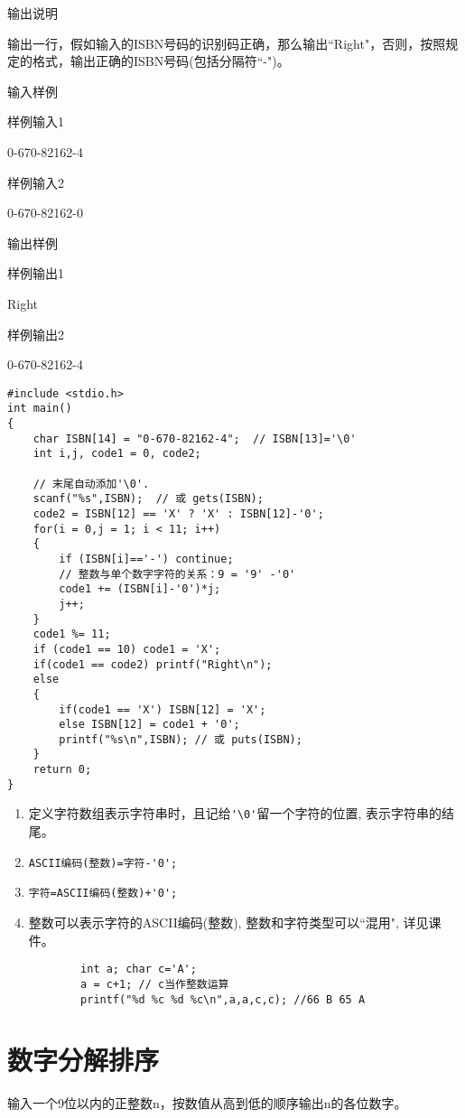 输出说明	

输出一行，假如输入的ISBN号码的识别码正确，那么输出``Right"，否则，按照规定的格式，输出正确的ISBN号码(包括分隔符``-")。

输入样例	

样例输入1

0-670-82162-4

样例输入2

0-670-82162-0

输出样例	

样例输出1

Right

样例输出2

0-670-82162-4

\begin{lstlisting}
#include <stdio.h>
int main()
{
	char ISBN[14] = "0-670-82162-4";  // ISBN[13]='\0'
	int i,j, code1 = 0, code2;
	
	// 末尾自动添加'\0'.
	scanf("%s",ISBN);  // 或 gets(ISBN); 
	code2 = ISBN[12] == 'X' ? 'X' : ISBN[12]-'0';
	for(i = 0,j = 1; i < 11; i++)
	{
		if (ISBN[i]=='-') continue;
		// 整数与单个数字字符的关系：9 = '9' -'0' 
		code1 += (ISBN[i]-'0')*j;  
		j++;
	}   
	code1 %= 11;
	if (code1 == 10) code1 = 'X';  
	if(code1 == code2) printf("Right\n");
	else 
	{
		if(code1 == 'X') ISBN[12] = 'X';
		else ISBN[12] = code1 + '0';
		printf("%s\n",ISBN); // 或 puts(ISBN);
	}
	return 0;
} 
\end{lstlisting}

\begin{note}[要点]
	\begin{enumerate}
		\item 定义字符数组表示字符串时，且记给\lstinline|'\0'|留一个字符的位置, 表示字符串的结尾。
		\item \lstinline|ASCII编码(整数)=字符-'0';|
		\item \lstinline|字符=ASCII编码(整数)+'0';|
		\item 整数可以表示字符的ASCII编码(整数), 整数和字符类型可以``混用", 详见课件。
		\begin{lstlisting}
		int a; char c='A';
		a = c+1; // c当作整数运算
		printf("%d %c %d %c\n",a,a,c,c); //66 B 65 A 
		\end{lstlisting}
	\end{enumerate}
\end{note}

\section{数字分解排序}
输入一个9位以内的正整数n，按数值从高到低的顺序输出n的各位数字。

